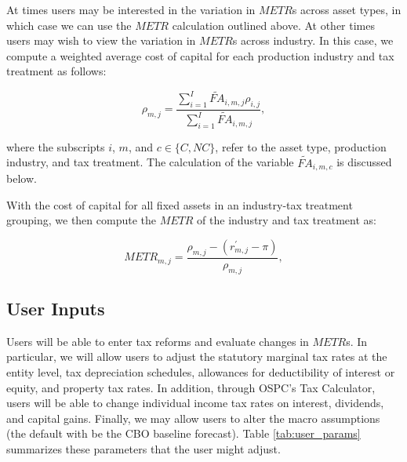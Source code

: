 \documentclass[article,11pt,letterpaper,fleqn]{article}
\theoremstyle{definition}
\numberwithin{equation}{section}
\begin{document}
At times users may be interested in the variation in $METR$s across asset types, in which case we can use the $METR$ calculation outlined above. At other times users may wish to view the variation in $METR$s across industry.  In this case, we compute a weighted average cost of capital for each production industry and tax treatment as follows:

\begin{equation}
\rho_{m,j} = \frac{\sum_{i=1}^{I}\widetilde{FA}_{i,m,j}\rho_{i,j}}{\sum_{i=1}^{I}\widetilde{FA}_{i,m,j}} ,
\end{equation}

\noindent\noindent where the subscripts $i$, $m$, and $c\in\{C,NC\}$, refer to the asset type, production industry, and tax treatment.  The calculation of the variable $\widetilde{FA}_{i,m,c}$ is discussed below.

With the cost of capital for all fixed assets in an industry-tax treatment grouping, we then compute the $METR$ of the industry and tax treatment as:

\begin{equation}
METR_{m,j} =  \frac{\rho_{m,j} - (r^{'}_{m,j}-\pi)}{\rho_{m,j}},
\end{equation}

\subsection{User Inputs}

Users will be able to enter tax reforms and evaluate changes in $METR$s.  In particular, we will allow users to adjust the statutory marginal tax rates at the entity level, tax depreciation schedules, allowances for deductibility of interest or equity, and property tax rates.  In addition, through OSPC's Tax Calculator, users will be able to change individual income tax rates on interest, dividends, and capital gains. Finally, we may allow users to alter the macro assumptions (the default with be the CBO baseline forecast).  Table \ref{tab:user_params} summarizes these parameters that the user might adjust.
\end{document}
